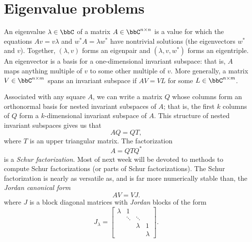 \section{Eigenvalue problems}

An eigenvalue $\lambda \in \bbC$ of a matrix $A \in \bbC^{n \times n}$
is a value for which the equations $A v = v \lambda$ and $w^* A = \lambda w^*$
have nontrivial
solutions (the eigenvectors $w^*$ and $v$).  Together, $(\lambda, v)$ forms an
eigenpair and $(\lambda, v, w^*)$ forms an eigentriple.
An eigenvector is a basis for a one-dimensional invariant
subspace: that is, $A$ maps anything multiple of $v$ to some other
multiple of $v$.  More generally, a matrix $V \in \bbC^{n \times m}$
spans an invariant subspace if $AV = VL$ for some
$L \in \bbC^{n \times m}$.

Associated with any square $A$, we can write a matrix $Q$ whose
columns form an orthonormal basis for nested invariant subspaces of
$A$; that is, the first $k$ columns of $Q$ form a $k$-dimensional
invariant subspace of $A$.  This structure of nested invariant
subspaces gives us that
\[
  AQ = QT,
\]
where $T$ is an upper triangular matrix.  The factorization
\[
  A = QTQ^*
\]
is a {\em Schur factorization}.  Most of next week will be devoted to
methods to compute Schur factorizations (or parts of Schur
factorizations).  The Schur factorization is nearly as versatile as,
and is far more numerically stable than, the {\em Jordan canonical form}
\[
  A V = V J.
\]
where $J$ is a block diagonal matrices with
{\em Jordan} blocks of the form
\[
  J_{\lambda} =
  \begin{bmatrix}
    \lambda & 1  \\
            & \ddots & \ddots \\
            &        & \lambda & 1 \\
            &        &         & \lambda
  \end{bmatrix}.
\]

